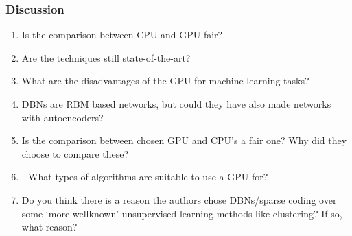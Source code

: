 \documentclass{beamer}
\begin{document}
\begin{frame}
  \frametitle{Discussion}

  \begin{enumerate}
    \item Is the comparison between CPU and GPU fair?
    \item Are the techniques still state-of-the-art?
    \item What are the disadvantages of the GPU for machine learning tasks?
    \item DBNs are RBM based networks, but could they have also made networks with autoencoders?
    \item Is the comparison between chosen GPU and CPU’s a fair one? Why did they choose to compare these?
    \item - What types of algorithms are suitable to use a GPU for?
    \item Do you think there is a reason the authors chose DBNs/sparse coding over some `more wellknown' unsupervised learning methods like clustering? If so, what reason?

\end{enumerate}
\end{frame}
\end{document}
